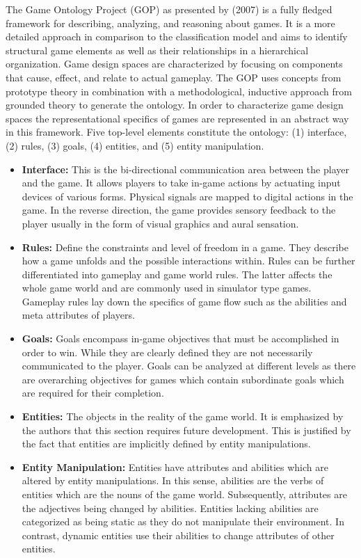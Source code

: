 The Game Ontology Project (GOP) as presented by \citeauthor{Zagal2007} (2007) is a fully fledged framework for describing, analyzing, and reasoning about games.
It is a more detailed approach in comparison to the classification model and aims to identify structural game elements as well as their relationships in a hierarchical organization.
Game design spaces are characterized by focusing on components that cause, effect, and relate to actual gameplay.
The GOP uses concepts from prototype theory in combination with a methodological, inductive approach from grounded theory to generate the ontology.
In order to characterize game design spaces the representational specifics of games are represented in an abstract way in this framework.
Five top-level elements constitute the ontology: (1) interface, (2) rules, (3) goals, (4) entities, and (5) entity manipulation.

\begin{itemize}
    \item \textbf{Interface:} This is the bi-directional communication area between the player and the game. It allows players to take in-game actions by actuating input devices of various forms. Physical signals are mapped to digital actions in the game. In the reverse direction, the game provides sensory feedback to the player usually in the form of visual graphics and aural sensation.
    \item \textbf{Rules:} Define the constraints and level of freedom in a game. They describe how a game unfolds and the possible interactions within. Rules can be further differentiated into gameplay and game world rules. The latter affects the whole game world and are commonly used in simulator type games. Gameplay rules lay down the specifics of game flow such as the abilities and meta attributes of players.
    \item \textbf{Goals:} Goals encompass in-game objectives that must be accomplished in order to win. While they are clearly defined they are not necessarily communicated to the player. Goals can be analyzed at different levels as there are overarching objectives for games which contain subordinate goals which are required for their completion.
    \item \textbf{Entities:} The objects in the reality of the game world. It is emphasized by the authors that this section requires future development. This is justified by the fact that entities are implicitly defined by entity manipulations.
    \item \textbf{Entity Manipulation:} Entities have attributes and abilities which are altered by entity manipulations. In this sense, abilities are the verbs of entities which are the nouns of the game world. Subsequently, attributes are the adjectives being changed by abilities. Entities lacking abilities are categorized as being static as they do not manipulate their environment. In contrast, dynamic entities use their abilities to change attributes of other entities.
\end{itemize}

